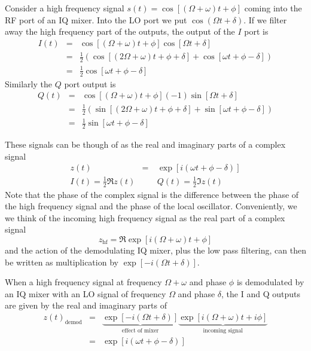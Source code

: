 Consider a high frequency signal $s(t) = \cos [ (\Omega+\omega)t + \phi ]$ coming into the RF port of an IQ mixer. Into the LO port we put $\cos(\Omega t + \delta)$. If we filter away the high frequency part of the outputs, the output of the $I$ port is \begin{eqnarray}
I(t) &=& \cos [ (\Omega + \omega)t + \phi ]\cos [ \Omega t + \delta ] \nonumber \\
&=& \frac{1}{2}\left( \cos [(2\Omega + \omega)t + \phi + \delta ] + \cos [ \omega t + \phi - \delta ] \right) \nonumber \\
&=& \frac{1}{2} \cos [ \omega t + \phi - \delta ] \end{eqnarray}
Similarly the $Q$ port output is \begin{eqnarray}
Q(t) &=& \cos [ (\Omega + \omega)t + \phi ](-1)\sin [ \Omega t + \delta ] \nonumber \\
&=& \frac{1}{2}\left( \sin [(2\Omega + \omega)t + \phi + \delta ] + \sin [ \omega t + \phi - \delta ] \right) \nonumber \\
&=& \frac{1}{2} \sin [ \omega t + \phi - \delta ] \end{eqnarray}

These signals can be though of as the real and imaginary parts of a complex signal \begin{eqnarray}
z(t) &=& \exp \left[i \left( \omega t + \phi - \delta \right) \right] \\
I(t) = \frac{1}{2}\Re z(t) & \quad & Q(t) = \frac{1}{2}\Im z(t) \end{eqnarray}
Note that the phase of the complex signal is the difference between the phase of the high frequency signal and the phase of the local oscillator. Conveniently, we we think of the incoming high frequency signal as the real part of a complex signal \begin{equation}
z_{\textrm{hf}}=\Re \exp \left[ i \left( \Omega + \omega \right)t +\phi \right]  \end{equation}
and the action of the demodulating IQ mixer, plus the low pass filtering, can then be written as multiplication by $\exp \left[ -i( \Omega t + \delta ) \right]$.


When a high frequency signal at frequency $\Omega+\omega$ and phase $\phi$ is demodulated by an IQ mixer with an LO signal of frequency $\Omega$ and phase $\delta$, the I and Q outputs are given by the real and imaginary parts of \begin{eqnarray}
z(t)_{\textrm{demod}} &=& \underbrace{\exp \left[-i \left( \Omega t + \delta \right) \right]}_{\textrm{effect of mixer}} \underbrace{\exp \left[ i\left( \Omega + \omega \right) t + i \phi \right]}_{\textrm{incoming signal}} \nonumber \\
&=& \exp \left[ i \left( \omega t + \phi-\delta \right) \right] \nonumber \end{eqnarray}

